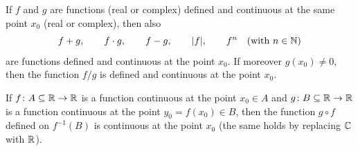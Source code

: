  \begin{theorem}
  \label{th:continuita_composizione}%
  If $f$ and $g$ are functions (real or complex) defined and continuous
  at the same point $x_0$ (real or complex),
  then also
  \[
    f+g, \qquad
    f\cdot g, \qquad
    f-g, \qquad
    {\left|f\right|}, \qquad
    f^n\quad \text{(with $n\in {\mathbb N}$)}
  \]
  are functions defined and continuous at the point $x_0$.
  If moreover $g(x_0)\neq 0$, then the function
  $f/g$
  is defined and continuous at the point $x_0$.
  
  If $f\colon A\subseteq {\mathbb R} \to {\mathbb R}$ is a function continuous
  at the point $x_0\in A$ and
  $g\colon B\subseteq {\mathbb R} \to {\mathbb R}$ is a function
  continuous at the point $y_0=f(x_0)\in B$, then the function $g\circ f$
  defined on $f^{-1}(B)$ is continuous at the point $x_0$
  (the same holds by replacing ${\mathbb C}$ with ${\mathbb R}$).
  \end{theorem}
